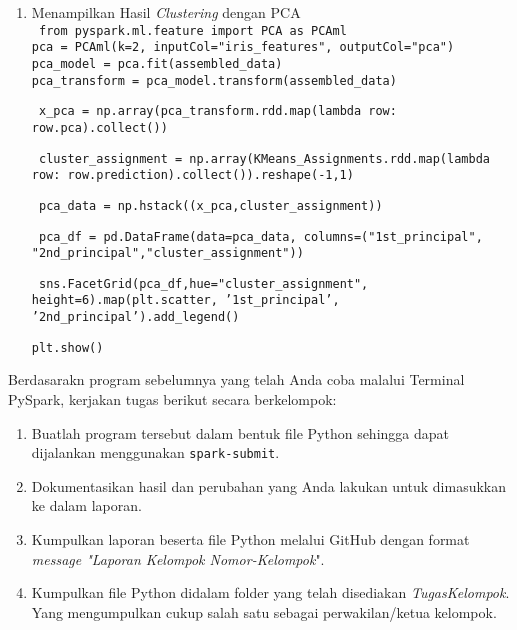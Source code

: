 \documentclass[a4paper]{tufte-handout}
\begin{document}
\begin{enumerate}
\item Menampilkan Hasil \textit{Clustering} dengan PCA \\
{\tt
from pyspark.ml.feature import PCA as PCAml \\
pca = PCAml(k=2, inputCol="iris\_features", outputCol="pca") \\
pca\_model = pca.fit(assembled\_data) \\
pca\_transform = pca\_model.transform(assembled\_data)
} 

{\tt
x\_pca = np.array(pca\_transform.rdd.map(lambda row: row.pca).collect())
}

{\tt
cluster\_assignment = np.array(KMeans\_Assignments.rdd.map(lambda row: row.prediction).collect()).reshape(-1,1)
}

{\tt
pca\_data = np.hstack((x\_pca,cluster\_assignment))
}

{\tt
pca\_df = pd.DataFrame(data=pca\_data, columns=("1st\_principal", "2nd\_principal","cluster\_assignment")) 
}

{\tt
sns.FacetGrid(pca\_df,hue="cluster\_assignment", height=6).map(plt.scatter, '1st\_principal', '2nd\_principal').add\_legend() \\
}

{\tt plt.show()}
\end{enumerate}

\hrulefill

\clearpage
{}


Berdasarakn program sebelumnya yang telah Anda coba malalui Terminal PySpark, kerjakan tugas berikut secara berkelompok:

\begin{enumerate}
\item Buatlah program tersebut dalam bentuk file Python sehingga dapat dijalankan menggunakan {\tt spark-submit}.
\item Dokumentasikan hasil dan perubahan yang Anda lakukan untuk dimasukkan ke dalam laporan.
\item Kumpulkan laporan beserta file Python melalui GitHub dengan format \textit{message "Laporan Kelompok Nomor-Kelompok}".
\item Kumpulkan file Python didalam folder yang telah disediakan \textit{TugasKelompok}. Yang mengumpulkan cukup salah satu sebagai perwakilan/ketua kelompok.
\end{enumerate}
\end{document}
